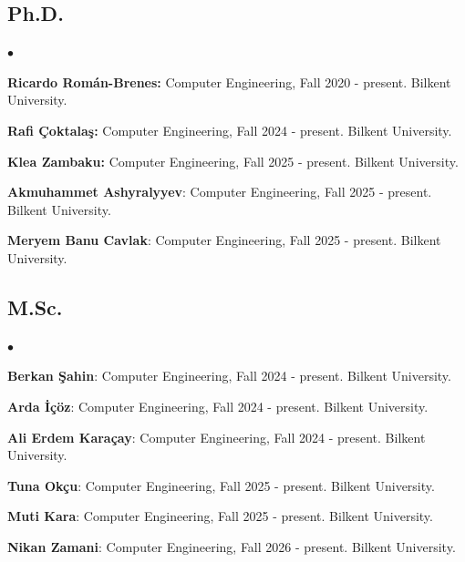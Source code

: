 \documentclass[margin,line]{res}
\newenvironment{list2}{
  \begin{list}{$\bullet$}{%
      \setlength{\itemsep}{0.1cm}
      \setlength{\parsep}{0in} \setlength{\parskip}{0in}
      \setlength{\topsep}{0in} \setlength{\partopsep}{0in} 
      \setlength{\leftmargin}{0.2in}}}{\end{list}}
\begin{document}
\begin{resume}
\subsection{\small \sc Ph.D.}
\begin{list2}
  \item
  {\bf Ricardo Román-Brenes:} Computer Engineering, Fall 2020 - present. Bilkent University. 
  \item
  {\bf Rafi Çoktalaş:} Computer Engineering, Fall 2024 - present. Bilkent University. 
  \item
  {\bf Klea Zambaku:} Computer Engineering, Fall 2025 - present.
  Bilkent University. 
  \item 
  \textbf{Akmuhammet Ashyralyyev}: Computer Engineering, Fall 2025 - present. Bilkent University. 
  \item 
  \textbf{Meryem Banu Cavlak}: Computer Engineering, Fall 2025 - present. Bilkent University. 
\end{list2}

\vspace*{-.4cm}
\subsection{\small \sc M.Sc.}
\begin{list2}    
  \item 
  \textbf{Berkan Şahin}: Computer Engineering, Fall 2024 - present. Bilkent University. 
  \item 
  \textbf{Arda İçöz}: Computer Engineering, Fall 2024 - present. Bilkent University. 
  \item 
  \textbf{Ali Erdem Karaçay}: Computer Engineering, Fall 2024 - present. Bilkent University.
  \item 
  \textbf{Tuna Okçu}: Computer Engineering, Fall 2025 - present. Bilkent University.  
  \item 
  \textbf{Muti Kara}: Computer Engineering, Fall 2025 - present. Bilkent University.  
  \item 
  \textbf{Nikan Zamani}: Computer Engineering, Fall 2026 - present. Bilkent University. 

\end{list2}

\vspace*{-.4cm}

\end{resume}
\end{document}
